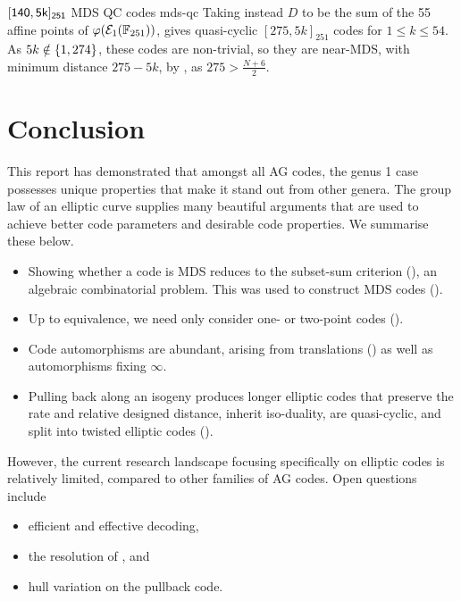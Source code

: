 \documentclass[twocolumn, 11pt]{scrartcl}
\begin{document}
\begin{example}{$\sf{[140,5k]_{251}}$ MDS\hspace{-1pt} QC\hspace{-1pt} codes \cite{code-f251}}{mds-qc}
Taking instead $D$ to be the sum of the 55 affine points of $\varphi(\mcE_1(\bbF_{251}))$,  gives quasi-cyclic $[275,5k]_{251}$ codes for $1\leq k\leq54$. As $5k\notin\set{1,274}$, these codes are non-trivial, so they are near-MDS, with minimum distance $275-5k$, by , as $275>\frac{N+6}2$.
\end{example}

\section{Conclusion} \label{section:conclusion}

This report has demonstrated that amongst all AG codes, the genus 1 case possesses unique properties that make it stand out from other genera. The group law of an elliptic curve supplies many beautiful arguments that are used to achieve better code parameters and desirable code properties. We summarise these below.

\begin{itemize}
    \item Showing whether a code is MDS reduces to the subset-sum criterion (), an algebraic combinatorial problem. This was used to construct MDS codes ().
    \item Up to equivalence, we need only consider one- or two-point codes ().
    \item Code automorphisms are abundant, arising from translations () as well as automorphisms fixing $\infty$.
    \item Pulling back along an isogeny produces longer elliptic codes that preserve the rate and relative designed distance, inherit iso-duality, are quasi-cyclic, and split into twisted elliptic codes ().
\end{itemize}

However, the current research landscape focusing specifically on elliptic codes is relatively limited, compared to other families of AG codes. Open questions include
\begin{itemize}
    \item efficient and effective decoding,
    \item the resolution of , and
    \item hull variation on the pullback code.
\end{itemize}
\end{document}
